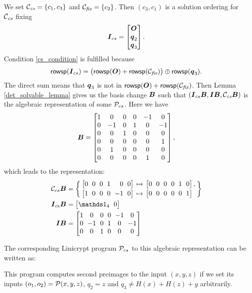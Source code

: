 We set $\Ccs = \{ c_1, c_3 \}$ and $\Cfix = \{c_2\}$.
Then $(c_3, c_1)$ is a solution ordering for $\Ccs$ fixing 
\[
\I_{cs} = \begin{bmatrix}\O \\ \vq_2 \\ \vq_3 \end{bmatrix}.
\]
Condition \eqref{cs_condition} is fulfilled because
\[
\rowsp(\I_{cs}) = \big(\rowsp(\O) + \rowsp(\Cfix)\big) \oplus \rowsp(\vq_3).
\]
The direct sum means that $\vq_3$ is not in $\rowsp(\O) + \rowsp(\Cfix)$.
Then Lemma \ref{det_solvable_lemma} gives us the basis change $\B$
such that $(\I_{cs} \B, \I \B, \Ccs \B)$
is the algebraic representation of some $\P_{cs}$.
Here we have
\[
\B = 
\begin{bmatrix}
1 & 0 & 0 & 0 &-1 & 0 \\
0 &-1 & 0 & 1 & 0 &-1 \\
0 & 0 & 1 & 0 & 0 & 0 \\
0 & 0 & 0 & 0 & 0 & 1 \\
0 & 1 & 0 & 0 & 0 & 0 \\
0 & 0 & 0 & 0 & 1 & 0
\end{bmatrix},
\]
which leads to the representation:
\begin{align*}
    \C_{cs} \B &= \left\{
        \arraycolsep=2pt
        \begin{array}{l l l}
            \m{0 & 0 & 0 & 1 &\phantom{-}0 & 0} & \mapsto & \m{0 & 0 & 0 & 0 & 1 & 0}, \\[2pt]
            \m{1 & 0 & 0 & 0 &-1 & 0} & \mapsto & \m{0 & 0 & 0 & 0 & 0 & 1}
        \end{array}
    \right\} \\
    \I_\textrm{cs} \B &= \m{\Id_4 & 0} \\
    \I \B &= \m{
1 & 0 & 0 & 0 &-1 & 0 \\
0 &-1 & 0 & 1 & 0 &-1 \\
0 & 0 & 1 & 0 & 0 & 0
    }    
\end{align*}

The corresponding Linicrypt program $\P_{cs}$ to this algebraic representation can be written as:

This program computes second preimages to the input $(x,y,z)$
if we set its inputs $(o_1, o_2) = \P(x,y,z)$, $q_2 = z$ and $q_3 \neq H(x) + H(z) + y$ arbitrarily.
